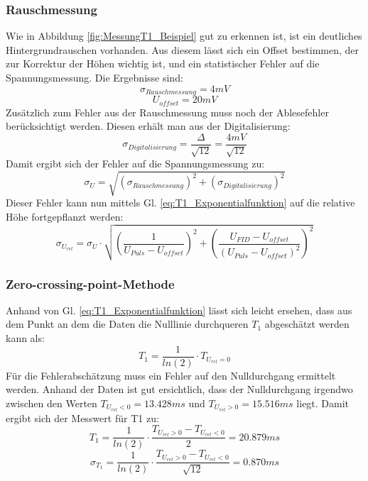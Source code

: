 \documentclass[12pt,a4paper]{article}
\begin{document}
\subsubsection{Rauschmessung}
Wie in Abbildung \ref{fig:MessungT1_Beispiel} gut zu erkennen ist, ist ein deutliches Hintergrundrauschen vorhanden. Aus diesem lässt sich ein Offset bestimmen, der zur Korrektur der Höhen wichtig ist, und ein statistischer Fehler auf die Spannungsmessung. Die Ergebnisse sind:
\begin{equation*}
\sigma _{Rauschmessung} = 4 mV
\end{equation*}
\begin{equation*}
U_{offset} = 20 mV
\end{equation*}
Zusätzlich zum Fehler aus der Rauschmessung muss noch der Ablesefehler berücksichtigt werden. Diesen erhält man aus der Digitalisierung:
\begin{equation*}
\sigma _{Digitalisierung} = \dfrac{\Delta}{\sqrt{12}} = \dfrac{4 mV}{\sqrt{12}}
\end{equation*}
Damit ergibt sich der Fehler auf die Spannungsmessung zu:
\begin{equation*}
\sigma _U = \sqrt{\left(\sigma _{Rauschmessung} \right)^2 + \left(\sigma _{Digitalisierung} \right)^2}
\end{equation*}
Dieser Fehler kann nun mittels Gl. \ref{eq:T1_Exponentialfunktion} auf die relative Höhe fortgepflanzt werden:
\begin{equation*}
\sigma _{U_{rel}} = \sigma _U \cdot \sqrt{\left(\dfrac{1}{U_{Puls} - U_{offset}}\right)^2 + \left(\dfrac{U_{FID} - U_{offset}}{(U_{Puls} - U_{offset})^2}\right)^2}
\end{equation*}


\subsubsection{Zero-crossing-point-Methode}
Anhand von Gl. \ref{eq:T1_Exponentialfunktion} lässt sich leicht ersehen, dass aus dem Punkt an dem die Daten die Nulllinie durchqueren $T_1$ abgeschätzt werden kann als:
\begin{equation*}
T_1 = \dfrac{1}{ln(2)} \cdot T_{U_{rel} = 0}
\end{equation*}
Für die Fehlerabschätzung muss ein Fehler auf den Nulldurchgang ermittelt werden. Anhand der Daten ist gut ersichtlich, dass der Nulldurchgang irgendwo zwischen den Werten $T_{U_{rel} < 0} = 13.428ms$ und $T_{U_{rel} > 0} = 15.516ms$ liegt. Damit ergibt sich der Messwert für T1 zu:
\begin{equation*}
T_1 = \dfrac{1}{ln(2)} \cdot \dfrac{T_{U_{rel} > 0} - T_{U_{rel} < 0}}{2} = 20.879 ms
\end{equation*}
\begin{equation*}
\sigma _{T_1} = \dfrac{1}{ln(2)} \cdot \dfrac{T_{U_{rel} > 0} - T_{U_{rel} < 0}}{\sqrt{12}} = 0.870 ms
\end{equation*}
\end{document}

